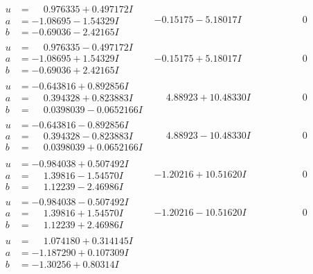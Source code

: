 \documentclass[1p]{elsarticle_modified}
\theoremstyle{definition}
\begin{document}
$$\begin{array}{c|c|c}
\begin{aligned}
u &= \phantom{-}0.976335 + 0.497172 I \\
a &= -1.08695 - 1.54329 I \\
b &= -0.69036 - 2.42165 I\end{aligned}
 & -0.15175 - 5.18017 I & \phantom{-0.000000 } 0 \\ \hline\begin{aligned}
u &= \phantom{-}0.976335 - 0.497172 I \\
a &= -1.08695 + 1.54329 I \\
b &= -0.69036 + 2.42165 I\end{aligned}
 & -0.15175 + 5.18017 I & \phantom{-0.000000 } 0 \\ \hline\begin{aligned}
u &= -0.643816 + 0.892856 I \\
a &= \phantom{-}0.394328 + 0.823883 I \\
b &= \phantom{-}0.0398039 - 0.0652166 I\end{aligned}
 & \phantom{-}4.88923 + 10.48330 I & \phantom{-0.000000 } 0 \\ \hline\begin{aligned}
u &= -0.643816 - 0.892856 I \\
a &= \phantom{-}0.394328 - 0.823883 I \\
b &= \phantom{-}0.0398039 + 0.0652166 I\end{aligned}
 & \phantom{-}4.88923 - 10.48330 I & \phantom{-0.000000 } 0 \\ \hline\begin{aligned}
u &= -0.984038 + 0.507492 I \\
a &= \phantom{-}1.39816 - 1.54570 I \\
b &= \phantom{-}1.12239 - 2.46986 I\end{aligned}
 & -1.20216 + 10.51620 I & \phantom{-0.000000 } 0 \\ \hline\begin{aligned}
u &= -0.984038 - 0.507492 I \\
a &= \phantom{-}1.39816 + 1.54570 I \\
b &= \phantom{-}1.12239 + 2.46986 I\end{aligned}
 & -1.20216 - 10.51620 I & \phantom{-0.000000 } 0 \\ \hline\begin{aligned}
u &= \phantom{-}1.074180 + 0.314145 I \\
a &= -1.187290 + 0.107309 I \\
b &= -1.30256 + 0.80314 I\end{aligned}

\end{array}$$
\end{document}
